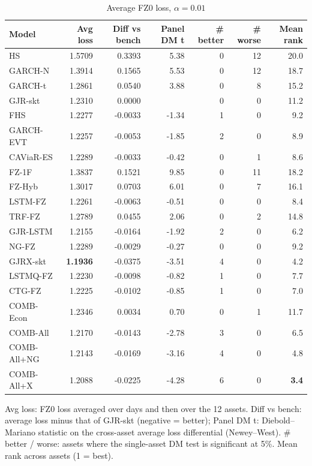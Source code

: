 \begin{table}[htbp]
\centering
\footnotesize
\caption{Average FZ0 loss, $\alpha=0.01$}
\label{tab:loss_a010}
\begin{tabular}{lrrrrrr}
\toprule
Model & Avg loss & Diff vs bench & Panel DM t & \# better & \# worse & Mean rank \\
\midrule
HS & 1.5709 & 0.3393 & 5.38 & 0 & 12 & 20.0 \\
GARCH-N & 1.3914 & 0.1565 & 5.53 & 0 & 12 & 18.7 \\
GARCH-t & 1.2861 & 0.0540 & 3.88 & 0 & 8 & 15.2 \\
GJR-skt & 1.2310 & 0.0000 &  & 0 & 0 & 11.2 \\
FHS & 1.2277 & -0.0033 & -1.34 & 1 & 0 & 9.2 \\
GARCH-EVT & 1.2257 & -0.0053 & -1.85 & 2 & 0 & 8.9 \\
CAViaR-ES & 1.2289 & -0.0033 & -0.42 & 0 & 1 & 8.6 \\
FZ-1F & 1.3837 & 0.1521 & 9.85 & 0 & 11 & 18.2 \\
FZ-Hyb & 1.3017 & 0.0703 & 6.01 & 0 & 7 & 16.1 \\
LSTM-FZ & 1.2261 & -0.0063 & -0.51 & 0 & 0 & 8.4 \\
TRF-FZ & 1.2789 & 0.0455 & 2.06 & 0 & 2 & 14.8 \\
GJR-LSTM & 1.2155 & -0.0164 & -1.92 & 2 & 0 & 6.2 \\
NG-FZ & 1.2289 & -0.0029 & -0.27 & 0 & 0 & 9.2 \\
GJRX-skt & \textbf{1.1936} & -0.0375 & -3.51 & 4 & 0 & 4.2 \\
LSTMQ-FZ & 1.2230 & -0.0098 & -0.82 & 1 & 0 & 7.7 \\
CTG-FZ & 1.2225 & -0.0102 & -0.85 & 1 & 0 & 7.0 \\
COMB-Econ & 1.2346 & 0.0034 & 0.70 & 0 & 1 & 11.7 \\
COMB-All & 1.2170 & -0.0143 & -2.78 & 3 & 0 & 6.5 \\
COMB-All+NG & 1.2143 & -0.0169 & -3.16 & 4 & 0 & 4.8 \\
COMB-All+X & 1.2088 & -0.0225 & -4.28 & 6 & 0 & \textbf{3.4} \\
\bottomrule
\end{tabular}
\par\smallskip\parbox{\linewidth}{\scriptsize Avg loss: FZ0 loss averaged over days and then over the 12 assets. Diff vs bench: average loss minus that of GJR-skt (negative = better); Panel DM t: Diebold--Mariano statistic on the cross-asset average loss differential (Newey--West). \# better / worse: assets where the single-asset DM test is significant at 5\%. Mean rank across assets (1 = best).}
\end{table}
